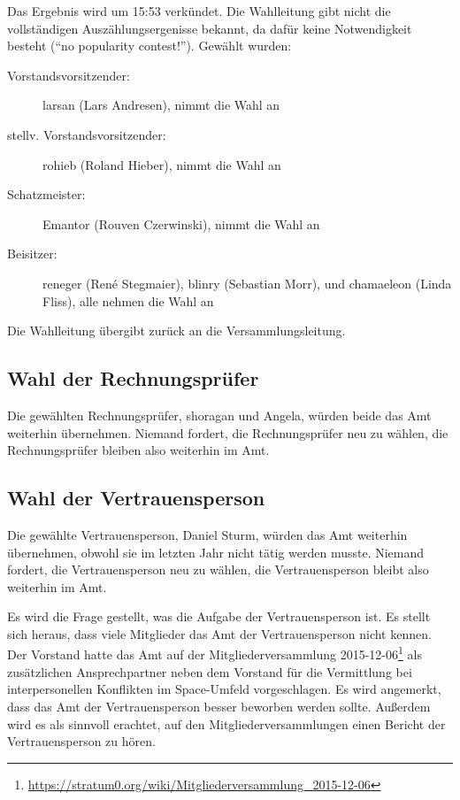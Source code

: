 \documentclass{s0minutes}
\begin{document}

Das Ergebnis wird um 15:53 verkündet. Die Wahlleitung gibt nicht die
vollständigen Auszählungsergenisse bekannt, da dafür keine Notwendigkeit
besteht ("`no popularity contest!"'). Gewählt wurden:

\begin{description}
  \item[Vorstandsvorsitzender:] larsan (Lars Andresen), nimmt die Wahl an
  \item[stellv. Vorstandsvorsitzender:] rohieb (Roland Hieber), nimmt die Wahl
    an
  \item[Schatzmeister:] Emantor (Rouven Czerwinski), nimmt die Wahl an
  \item[Beisitzer:] reneger (René Stegmaier), blinry (Sebastian Morr), und
    chamaeleon (Linda Fliss), alle nehmen die Wahl an
\end{description}

Die Wahlleitung übergibt zurück an die Versammlungsleitung.

\subsection{Wahl der Rechnungsprüfer}

Die gewählten Rechnungsprüfer, shoragan und Angela, würden beide das Amt
weiterhin übernehmen. Niemand fordert, die Rechnungsprüfer neu zu wählen, die
Rechnungsprüfer bleiben also weiterhin im Amt.

\subsection{Wahl der Vertrauensperson}

Die gewählte Vertrauensperson, Daniel Sturm, würden das Amt weiterhin
übernehmen, obwohl sie im letzten Jahr nicht tätig werden musste. Niemand
fordert, die Vertrauensperson neu zu wählen, die Vertrauensperson bleibt also
weiterhin im Amt.

Es wird die Frage gestellt, was die Aufgabe der Vertrauensperson ist. Es stellt
sich heraus, dass viele Mitglieder das Amt der Vertrauensperson nicht kennen.
Der Vorstand hatte das Amt auf der Mitgliederversammlung
2015-12-06\footnote{\url{https://stratum0.org/wiki/Mitgliederversammlung_2015-12-06}}
als zusätzlichen Ansprechpartner neben dem Vorstand für die Vermittlung bei
interpersonellen Konflikten im Space-Umfeld vorgeschlagen. Es wird angemerkt,
dass das Amt der Vertrauensperson besser beworben werden sollte. Außerdem wird
es als sinnvoll erachtet, auf den Mitgliederversammlungen einen Bericht der
Vertrauensperson zu hören. 
\end{document}
